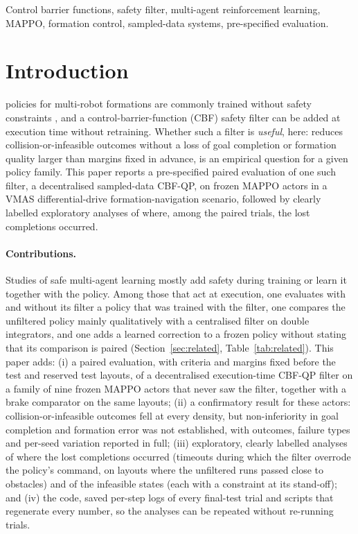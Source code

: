 \documentclass[journal]{IEEEtran}
\begin{document}
\begin{IEEEkeywords}
Control barrier functions, safety filter, multi-agent reinforcement learning, MAPPO, formation
control, sampled-data systems, pre-specified evaluation.
\end{IEEEkeywords}

\section{Introduction}
 policies for multi-robot formations are commonly trained without safety
constraints \cite{brunke2022}, and a control-barrier-function (CBF) safety filter \cite{ames2019}
can be added at execution time without retraining. Whether such a filter is \emph{useful}, here: reduces
collision-or-infeasible outcomes without a loss of goal completion or formation quality larger than
margins fixed in advance, is an empirical question for a given policy family. This paper reports a pre-specified paired evaluation
of one such filter, a decentralised sampled-data CBF-QP, on frozen MAPPO \cite{yu2022mappo} actors
in a VMAS \cite{bettini2022vmas} differential-drive formation-navigation scenario, followed by clearly
labelled exploratory analyses of where, among the paired trials, the lost completions occurred.

\paragraph{Contributions.} Studies of safe multi-agent learning mostly add safety during training or
learn it together with the policy. Among those that act at execution, one evaluates with and without
its filter a policy that was trained with the filter, one compares the unfiltered policy mainly
qualitatively with a centralised filter on double integrators, and one adds a learned correction to a
frozen policy without stating that its comparison is paired (Section~\ref{sec:related},
Table~\ref{tab:related}). This paper adds:
(i) a paired evaluation, with criteria and margins fixed before the test and reserved test layouts,
of a decentralised execution-time CBF-QP filter on a family of nine frozen MAPPO actors that never saw
the filter, together with a brake comparator on the same layouts;
(ii) a confirmatory result for these actors: collision-or-infeasible outcomes fell at every density,
but non-inferiority in goal completion and formation error was not established, with outcomes,
failure types and per-seed variation reported in full;
(iii) exploratory, clearly labelled analyses of where the lost completions occurred (timeouts during
which the filter overrode the policy's command, on layouts where the unfiltered runs passed close to
obstacles) and of the infeasible states (each with a constraint at its stand-off); and
(iv) the code, saved per-step logs of every final-test trial and scripts that regenerate every number,
so the analyses can be repeated without re-running trials.
\end{document}
